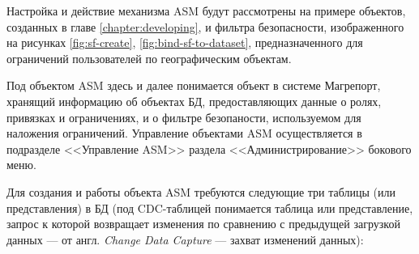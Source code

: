 \documentclass[../user-manual.tex]{subfiles}
\begin{document}
	Настройка и действие механизма ASM будут рассмотрены на примере объектов, созданных в главе \ref{chapter:developing}, и фильтра безопасности, изображенного на рисунках \ref{fig:sf-create}, \ref{fig:bind-sf-to-dataset}, предназначенного для ограничений пользователей по географическим объектам.
	
	Под объектом ASM здесь и далее понимается объект в системе Магрепорт, хранящий информацию об объектах БД, предоставляющих данные о ролях, привязках и ограничениях, и о фильтре безопаности, используемом для наложения ограничений. Управление объектами ASM осуществляется в подразделе <<Управление ASM>> раздела <<Администрирование>> бокового меню. 
	
	Для создания и работы объекта ASM требуются следующие три таблицы (или представления) в БД (под CDC-таблицей понимается таблица или представление, запрос к которой возвращает изменения по сравнению с предыдущей загрузкой данных --- от англ. \textit{Change Data Capture} --- захват изменений данных):
\end{document}
